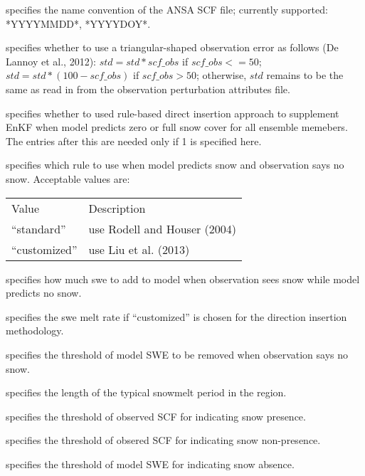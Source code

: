   specifies the name convention
 of the ANSA SCF file; currently supported: *YYYYMMDD*, *YYYYDOY*.

  specifies
 whether to use a triangular-shaped observation error as follows
 (De Lannoy et al., 2012):
 $std = std*scf\_obs$ if $scf\_obs<=50$;
 $std = std*(100-scf\_obs)$ if $scf\_obs>50$;
 otherwise, $std$ remains to be the same as read in from the observation
 perturbation attributes file.

  specifies whether to used rule-based
 direct insertion approach to supplement EnKF when model predicts zero
 or full snow cover for all ensemble memebers. The entries after this
 are needed only if 1 is specified here.

  specifies which
 rule to use when model predicts snow and observation says no snow.
 Acceptable values are:

 \begin{tabular}{ll}
 Value           & Description                  \\
  ``standard''   & use Rodell and Houser (2004) \\
  ``customized'' & use Liu et al. (2013)        \\
 \end{tabular}

  specifies how much
 swe to add to model when observation sees snow while model predicts
 no snow.

  specifies the swe melt rate
 if ``customized'' is chosen for the direction insertion methodology.

  specifies
 the threshold of model SWE to be removed when observation says no snow.

  specifies the length
 of the typical snowmelt period in the region.

  specifies
 the threshold of observed SCF for indicating snow presence.

 specifies the threshold of obsered SCF for indicating snow non-presence.

 specifies the threshold of model SWE for indicating snow absence.

